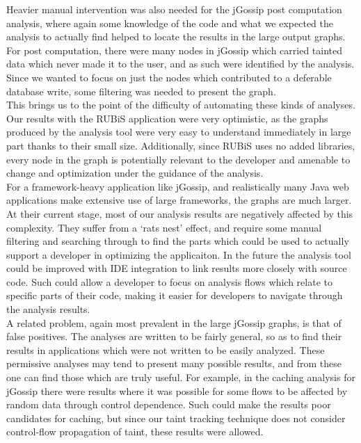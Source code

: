 \documentclass[msc,oneside]{ubcthesis}
\begin{document}
Heavier manual intervention was also needed for the jGossip post computation analysis, where again some knowledge of the code and what we expected the analysis to actually find helped to locate the results in the large output graphs. For post computation, there were many nodes in jGossip which carried tainted data which never made it to the user, and as such were identified by the analysis. Since we wanted to focus on just the nodes which contributed to a deferable database write, some filtering was needed to present the graph.\\

This brings us to the point of the difficulty of automating these kinds of analyses. Our results with the RUBiS application were very optimistic, as the graphs produced by the analysis tool were very easy to understand immediately in large part thanks to their small size. Additionally, since RUBiS uses no added libraries, every node in the graph is potentially relevant to the developer and amenable to change and optimization under the guidance of the analysis.\\

For a framework-heavy application like jGossip, and realistically many Java web applications make extensive use of large frameworks, the graphs are much larger. At their current stage, most of our analysis results are negatively affected by this complexity. They suffer from a `rats nest' effect, and require some manual filtering and searching through to find the parts which could be used to actually support a developer in optimizing the applicaiton. In the future the analysis tool could be improved with IDE integration to link results more closely with source code. Such could allow a developer to focus on analysis flows which relate to specific parts of their code, making it easier for developers to navigate through the analysis results.\\

A related problem, again most prevalent in the large jGossip graphs, is that of false positives. The analyses are written to be fairly general, so as to find their results in applications which were not written to be easily analyzed. These permissive analyses may tend to present many possible results, and from these one can find those which are truly useful. For example, in the caching analysis for jGossip there were results where it was possible for some flows to be affected by random data through control dependence. Such could make the results poor candidates for caching, but since our taint tracking technique does not consider control-flow propagation of taint, these results were allowed.\\
\end{document}
